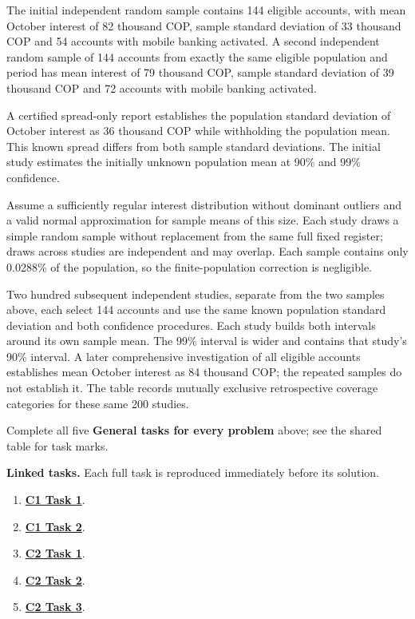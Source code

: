 The initial independent random sample contains 144 eligible accounts, with mean October interest of 82 thousand COP, sample standard deviation of 33 thousand COP and 54 accounts with mobile banking activated. A second independent random sample of 144 accounts from exactly the same eligible population and period has mean interest of 79 thousand COP, sample standard deviation of 39 thousand COP and 72 accounts with mobile banking activated.

A certified spread-only report establishes the population standard deviation of October interest as 36 thousand COP while withholding the population mean. This known spread differs from both sample standard deviations. The initial study estimates the initially unknown population mean at 90\% and 99\% confidence.

Assume a sufficiently regular interest distribution without dominant outliers and a valid normal approximation for sample means of this size. Each study draws a simple random sample without replacement from the same full fixed register; draws across studies are independent and may overlap. Each sample contains only 0.0288\% of the population, so the finite-population correction is negligible.

Two hundred subsequent independent studies, separate from the two samples above, each select 144 accounts and use the same known population standard deviation and both confidence procedures. Each study builds both intervals around its own sample mean. The 99\% interval is wider and contains that study's 90\% interval. A later comprehensive investigation of all eligible accounts establishes mean October interest as 84 thousand COP; the repeated samples do not establish it. The table records mutually exclusive retrospective coverage categories for these same 200 studies.


Complete all five \textbf{General tasks for every problem} above; see the shared table for task marks.

\textbf{Linked tasks.} Each full task is reproduced immediately before its solution.

\begin{enumerate}[label=(\alph*),itemsep=6pt]
\item \hyperref[sol:p2c1a]{\textbf{C1 Task 1}}. \cOneA\ 
\item \hyperref[sol:p2c1b]{\textbf{C1 Task 2}}. \cOneB\ 
\item \hyperref[sol:p2c2a]{\textbf{C2 Task 1}}. \cTwoA\ 
\item \hyperref[sol:p2c2b]{\textbf{C2 Task 2}}. \cTwoB\ 
\item \hyperref[sol:p2c2c]{\textbf{C2 Task 3}}. \cTwoC\ 
\end{enumerate}
\secInicio[][sec:p2]

